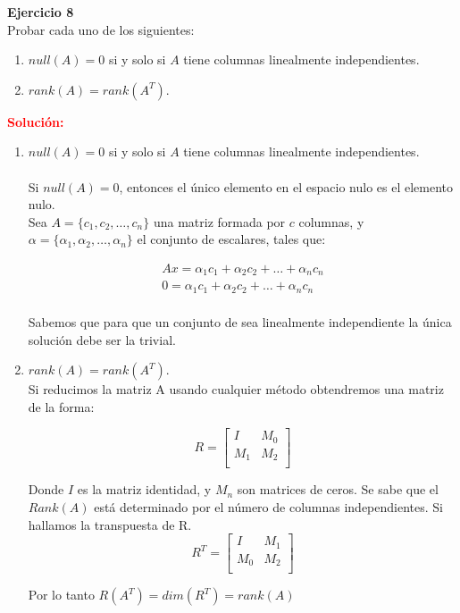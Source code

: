 \documentclass[12pt]{article}
\begin{document}

\noindent \textbf{Ejercicio 8}\\ Probar cada uno de los siguientes:
\begin{enumerate}[label=(\alph*)]
 \item $null(A)=0$ si y solo si $A$ tiene columnas linealmente independientes.
 \item $rank(A) = rank(A^T)$.
\end{enumerate}

\noindent \textcolor{red}{\bf Solución:}
\begin{enumerate}[label=(\alph*)]
    \item $null(A)=0$ si y solo si $A$ tiene columnas linealmente independientes.
    \\\\
    Si $null(A) = 0$, entonces el único elemento en el espacio nulo es el elemento nulo.\\
    Sea $A=\{c_1, c_2, \ldots, c_n\}$ una matriz formada por $c$ columnas, y  $\alpha = \{\alpha_1, \alpha_2, \ldots, \alpha_n\}$ el conjunto de escalares, tales que:
    
    \begin{align*}
        Ax = \alpha_1 c_1 + \alpha_2 c_2 + \ldots + \alpha_n c_n\\
        0 = \alpha_1 c_1 + \alpha_2 c_2 + \ldots + \alpha_n c_n\\
    \end{align*}
    
    Sabemos que para que un conjunto de sea linealmente independiente la única solución debe ser la trivial.
    \item $rank(A) = rank(A^T)$.
    \\
    Si reducimos la matriz A usando cualquier método obtendremos una matriz de la forma:
    
    \[
    R=\begin{bmatrix}
    I & M_0 \\
    M_1 & M_2 \\
    \end{bmatrix}
    \]
    
    Donde $I$ es la matriz identidad, y $M_n$ son matrices de ceros. Se sabe que el $Rank(A)$ está determinado por el número de columnas independientes. Si hallamos la transpuesta de R.
    \[
    R^T=\begin{bmatrix}
    I & M_1 \\
    M_0 & M_2 \\
    \end{bmatrix}
    \]
    
    Por lo tanto $R(A^T) = dim(R^T) = rank(A)$
    
\end{enumerate}
\end{document}
